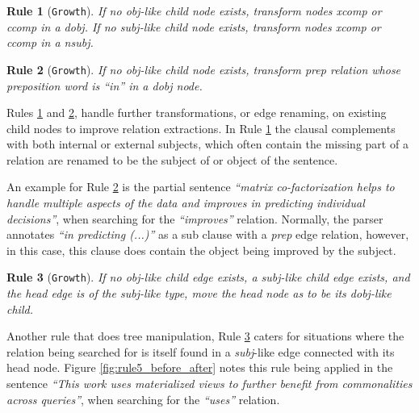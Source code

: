 \documentclass[11pt,a4paper,openright]{memoir}
\newtheorem{treerule}{Rule}
\begin{document}
\begin{treerule}[\texttt{Growth}]
\label{treerule:rule3}
If no \emph{obj}-like child node exists, transform nodes \emph{xcomp} or \emph{ccomp} in a \emph{dobj}. If no \emph{subj}-like child node exists, transform nodes \emph{xcomp} or \emph{ccomp} in a \emph{nsubj}.
\end{treerule}

\begin{treerule}[\texttt{Growth}]
\label{treerule:rule4}
If no \emph{obj}-like child node exists, transform \emph{prep} relation whose preposition word is \emph{\enquote{in}} in a \emph{dobj} node.
\end{treerule}

Rules \ref{treerule:rule3} and \ref{treerule:rule4}, handle further transformations, or edge renaming, on existing child nodes to improve relation extractions. In Rule \ref{treerule:rule3} the clausal complements with both internal or external subjects, which often contain the missing part of a relation are renamed to be the subject of or object of the sentence.

An example for Rule \ref{treerule:rule4} is the partial sentence \emph{\enquote{matrix co-factorization helps to handle multiple aspects of the data and improves in predicting individual decisions}}, when searching for the \emph{\enquote{improves}} relation. Normally, the parser annotates \emph{\enquote{in predicting (...)}} as a sub clause with a \emph{prep} edge relation, however, in this case, this clause does contain the object being improved by the subject.

\begin{treerule}[\texttt{Growth}]
\label{treerule:rule5}
If no \emph{obj}-like child edge exists, a \emph{subj}-like child edge exists, and the head edge is of the \emph{subj}-like type, move the head node as to be its \emph{dobj}-like child.
\end{treerule}

Another rule that does tree manipulation, Rule \ref{treerule:rule5} caters for situations where the relation being searched for is itself found in a \emph{subj}-like edge connected with its head node. Figure \ref{fig:rule5_before_after} notes this rule being applied in the sentence \emph{\enquote{This work uses materialized views to further benefit from commonalities across queries}}, when searching for the \emph{\enquote{uses}} relation.
\end{document}
